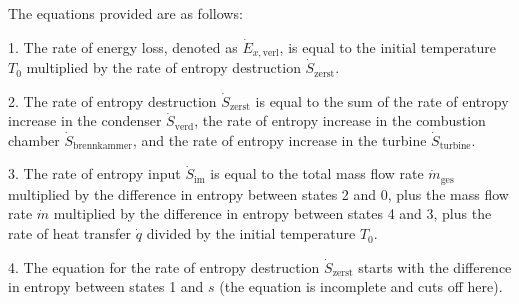 The equations provided are as follows:

1. The rate of energy loss, denoted as \( \dot{E}_{x, \text{verl}} \), is equal to the initial temperature \( T_0 \) multiplied by the rate of entropy destruction \( \dot{S}_{\text{zerst}} \).

2. The rate of entropy destruction \( \dot{S}_{\text{zerst}} \) is equal to the sum of the rate of entropy increase in the condenser \( \dot{S}_{\text{verd}} \), the rate of entropy increase in the combustion chamber \( \dot{S}_{\text{brennkammer}} \), and the rate of entropy increase in the turbine \( \dot{S}_{\text{turbine}} \).

3. The rate of entropy input \( \dot{S}_{\text{im}} \) is equal to the total mass flow rate \( \dot{m}_{\text{ges}} \) multiplied by the difference in entropy between states 2 and 0, plus the mass flow rate \( \dot{m} \) multiplied by the difference in entropy between states 4 and 3, plus the rate of heat transfer \( \dot{q} \) divided by the initial temperature \( T_0 \).

4. The equation for the rate of entropy destruction \( \dot{S}_{\text{zerst}} \) starts with the difference in entropy between states 1 and \( s \) (the equation is incomplete and cuts off here).